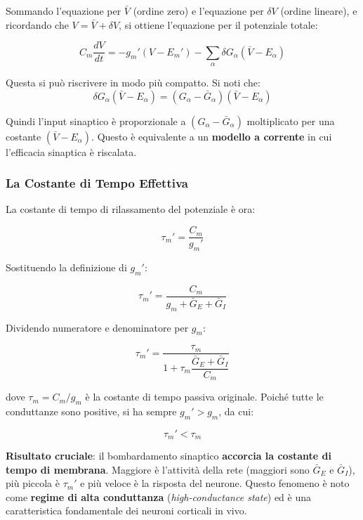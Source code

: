 Sommando l'equazione per $\bar{V}$ (ordine zero) e l'equazione per $\delta V$ (ordine lineare), e ricordando che $V = \bar{V} + \delta V$, si ottiene l'equazione per il potenziale totale:

\begin{equation}
C_m \frac{dV}{dt} = -g_m'(V - E_m') - \sum_\alpha \delta G_\alpha(\bar{V} - E_\alpha)
\end{equation}

Questa si può riscrivere in modo più compatto. Si noti che:
\begin{equation}
\delta G_\alpha (\bar{V} - E_\alpha) = (G_\alpha - \bar{G}_\alpha)(\bar{V} - E_\alpha)
\end{equation}

Quindi l'input sinaptico è proporzionale a $(G_\alpha - \bar{G}_\alpha)$ moltiplicato per una costante $(\bar{V} - E_\alpha)$. Questo è equivalente a un \textbf{modello a corrente} in cui l'efficacia sinaptica è riscalata.

\subsubsection{La Costante di Tempo Effettiva}

La costante di tempo di rilassamento del potenziale è ora:

\begin{equation}
\tau_m' = \frac{C_m}{g_m'}
\end{equation}

Sostituendo la definizione di $g_m'$:

\begin{equation}
\tau_m' = \frac{C_m}{g_m + \bar{G}_E + \bar{G}_I}
\end{equation}

Dividendo numeratore e denominatore per $g_m$:

\begin{equation}
\boxed{\tau_m' = \frac{\tau_m}{1 + \tau_m \dfrac{\bar{G}_E + \bar{G}_I}{C_m}}}
\end{equation}

dove $\tau_m = C_m/g_m$ è la costante di tempo passiva originale. Poiché tutte le conduttanze sono positive, si ha sempre $g_m' > g_m$, da cui:

\begin{equation}
\tau_m' < \tau_m
\end{equation}

\textbf{Risultato cruciale}: il bombardamento sinaptico \textbf{accorcia la costante di tempo di membrana}. Maggiore è l'attività della rete (maggiori sono $\bar{G}_E$ e $\bar{G}_I$), più piccola è $\tau_m'$ e più veloce è la risposta del neurone. Questo fenomeno è noto come \textbf{regime di alta conduttanza} (\textit{high-conductance state}) ed è una caratteristica fondamentale dei neuroni corticali in vivo.



